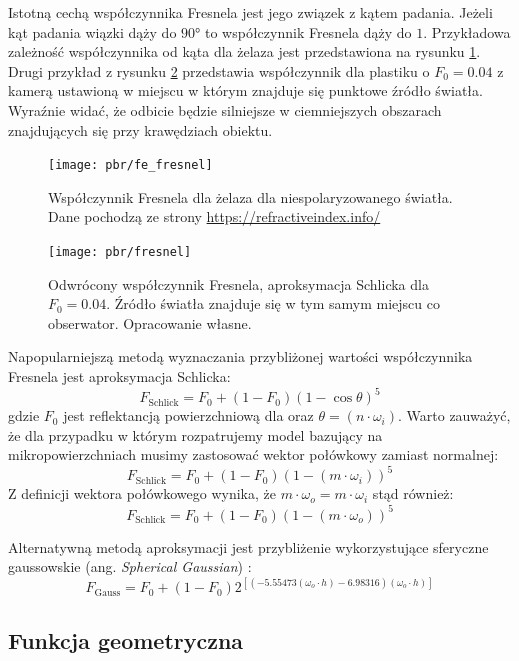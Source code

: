 \documentclass[../main.tex]{subfiles}
\begin{document}
Istotną cechą współczynnika Fresnela jest jego związek z kątem padania. Jeżeli kąt padania wiązki dąży do $\ang{90}$ to współczynnik Fresnela dąży do $1$. Przykładowa zależność współczynnika od kąta dla żelaza jest przedstawiona na rysunku \ref{fig:fe_fresnel}. Drugi przykład z rysunku \ref{fig:schlick_fresnel} przedstawia współczynnik dla plastiku o $F_0 = 0.04$ z kamerą ustawioną w miejscu w którym znajduje się punktowe źródło światła. Wyraźnie widać, że odbicie będzie silniejsze w ciemniejszych obszarach znajdujących się przy krawędziach obiektu.

\begin{figure}[ht]
    \centering
    \texttt{[image: pbr/fe\_fresnel]}
    \caption{Współczynnik Fresnela dla żelaza dla niespolaryzowanego światła. Dane pochodzą ze strony \url{https://refractiveindex.info/}}
    \label{fig:fe_fresnel}
\end{figure}

\begin{figure}[h]
    \centering
    \texttt{[image: pbr/fresnel]}
    \caption{Odwrócony współczynnik Fresnela, aproksymacja Schlicka dla $F_0 = 0.04$. Źródło światła znajduje się w tym samym miejscu co obserwator. Opracowanie własne.}
    \label{fig:schlick_fresnel}
\end{figure}

Napopularniejszą metodą wyznaczania przybliżonej wartości współczynnika Fresnela jest aproksymacja Schlicka:
\[
    F_{\text{Schlick}} = F_0 + (1-F_0)(1-\cos\theta)^5
\]
\noindent gdzie $F_0$ jest reflektancją powierzchniową dla  oraz $\theta = (n \cdot \omega_i)$. Warto zauważyć, że dla przypadku w którym rozpatrujemy model bazujący na mikropowierzchniach musimy zastosować wektor połówkowy zamiast normalnej:
\[
    F_{\text{Schlick}} = F_0 + (1-F_0)\left(
        1 - \left(
            m \cdot \omega_i
        \right)
    \right)^5
\]
\noindent Z definicji wektora połówkowego wynika, że $m \cdot \omega_o = m \cdot \omega_i$ stąd również:
\[
F_{\text{Schlick}} = F_0 + (1-F_0)(1 - (m \cdot \omega_o))^5
\]

Alternatywną metodą aproksymacji jest przybliżenie wykorzystujące sferyczne gaussowskie (ang. \textit{Spherical Gaussian}) \cite{pbr_ue4,SphericalGaussianLegarde}:
\[
    F_{\text{Gauss}} = F_0 +(1−F_0) 2^{\left[
        \left(
            −5.55473\left(\omega_o \cdot h\right)−6.98316
        \right) 
        (\omega_o \cdot h)
  \right]}
\]

\subsection{Funkcja geometryczna}
\end{document}
